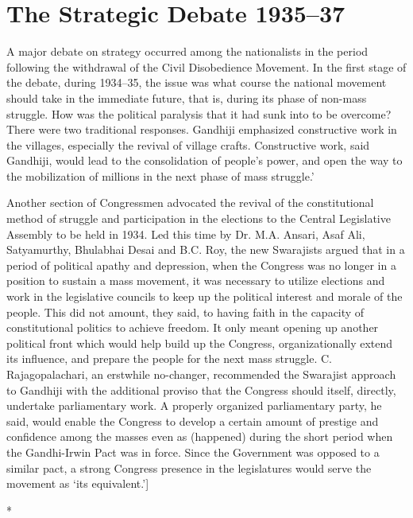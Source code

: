 \chapter{The Strategic Debate 1935--37}\label{chapter:CH25}

A major debate on strategy occurred among the nationalists in the period following the withdrawal of the Civil Disobedience Movement. In the first stage of the debate, during 1934--35, the issue was what course the national movement should take in the immediate future, that is, during its phase of non-mass struggle. How was the political paralysis that it had sunk into to be overcome? There were two traditional responses. Gandhiji emphasized constructive work in the villages, especially the revival of village crafts. Constructive work, said Gandhiji, would lead to the consolidation of people's power, and open the way to the mobilization of millions in the next phase of mass struggle.' 

Another section of Congressmen advocated the revival of the constitutional method of struggle and participation in the elections to the Central Legislative Assembly to be held in 1934. Led this time by Dr. M.A. Ansari, Asaf Ali, Satyamurthy, Bhulabhai Desai and B.C. Roy, the new Swarajists argued that in a period of political apathy and depression, when the Congress was no longer in a position to sustain a mass movement, it was necessary to utilize elections and work in the legislative councils to keep up the political interest and morale of the people. This did not amount, they said, to having faith in the capacity of constitutional politics to achieve freedom. It only meant opening up another political front which would help build up the Congress, organizationally extend its influence, and prepare the people for the next mass struggle. C. Rajagopalachari, an erstwhile no-changer, recommended the Swarajist approach to Gandhiji with the additional proviso that the Congress should itself, directly, undertake parliamentary work. A properly organized parliamentary party, he said, would enable the Congress to develop a certain amount of prestige and confidence among the masses even as (happened) during the short period when the Gandhi-Irwin Pact was in force. Since the Government was opposed to a similar pact, a strong Congress presence in the legislatures would serve the movement as `its equivalent.']

\begin{center}*\end{center}

